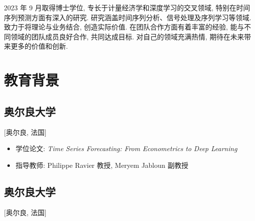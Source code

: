 \documentclass{mycv}
\begin{document}
\maketitle

\begin{summary}
  2023 年 9 月取得博士学位, 专长于计量经济学和深度学习的交叉领域, 特别在时间序列预测方面有深入的研究. 研究涵盖时间序列分析、信号处理及序列学习等领域. 致力于将理论与业务结合, 创造实际价值. 在团队合作方面有着丰富的经验, 能与不同领域的团队成员良好合作, 共同达成目标. 对自己的领域充满热情, 期待在未来带来更多的价值和创新.
\end{summary}


\section{教育背景}

\subsection{\large 奥尔良大学}[奥尔良, 法国]

\begin{positions}
\end{positions}

\begin{itemize}
  \itemsep 0.4em
  \item 学位论文: \textit{Time Series Forecasting: From Econometrics to Deep Learning}
  \item 指导教师: Philippe Ravier 教授, Meryem Jabloun 副教授
\end{itemize}

\vspace{-\parskip}

\subsection{\large 奥尔良大学}[奥尔良, 法国]

\begin{positions}
\end{positions}
\end{document}
